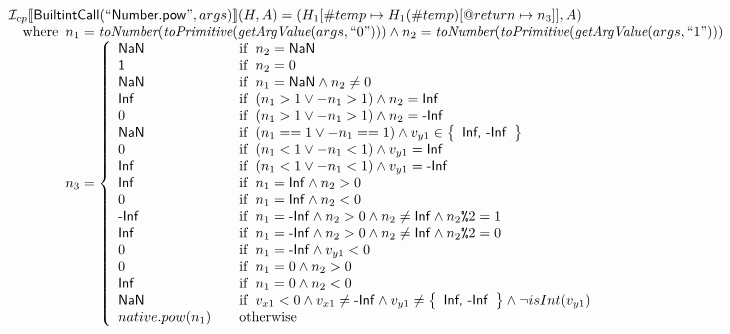\[
\begin{array}{l}

\I _{cp}\lbr \SF{BuiltintCall}(``\SF{Number.pow}",args)\rbr(H,A)
  = (H_1[\#temp \mapsto H_1(\#temp)[@return \mapsto n_3]], A)\\
\quad\wherec{
  n_1 = \hf{toNumber}(\hf{toPrimitive}(\hf{getArgValue}(args, ``0")))
  \land n_2 = \hf{toNumber}(\hf{toPrimitive}(\hf{getArgValue}(args, ``1")))\\
  n_3 = \left\{
    \begin{array}{l@{\quad\quad}l}
      \SF{NaN} & \ifc{n_2 =\SF{NaN}}\\
      \SF{1}   & \ifc{n_2 =0}\\
      \SF{NaN} & \ifc{n_1=\SF{NaN} \land n_2 \neq0}\\
      \SF{Inf} & \ifc{(n_1 > 1 \lor -n_1 > 1) \land n_2 =\SF{Inf}}\\
      0        & \ifc{(n_1 > 1 \lor -n_1 > 1) \land n_2 =\SF{-Inf}}\\
      \SF{NaN} & \ifc{(n_1 == 1 \lor -n_1 == 1) \land v_{y1}\in\set{\SF{Inf, -Inf}}}\\
      0        & \ifc{(n_1 < 1 \lor -n_1 < 1) \land v_{y1}=\SF{Inf}}\\
      \SF{Inf} & \ifc{(n_1 < 1 \lor -n_1 < 1) \land v_{y1}=\SF{-Inf}}\\
      \SF{Inf} & \ifc{n_1=\SF{Inf} \land n_2>0}\\
      0        & \ifc{n_1=\SF{Inf} \land n_2<0}\\
      \SF{-Inf} & \ifc{n_1=\SF{-Inf} \land n_2 > 0 \land n_2 \neq \SF{Inf} \land n_2 \TT{\%} 2 = 1}\\
      \SF{Inf} & \ifc{n_1=\SF{-Inf} \land n_2 > 0 \land n_2 \neq \SF{Inf}  \land  n_2 \TT{\%} 2 = 0}\\
      0        & \ifc{n_1=\SF{-Inf} \land v_{y1}<0}\\
      0        & \ifc{n_1 =0 \land n_2 >0}\\
      \SF{Inf} & \ifc{n_1 =0 \land n_2 <0}\\

      \SF{NaN} & \ifc{v_{x1}<0 \land v_{x1}\neq\SF{-Inf} \land v_{y1}\neq\set{\SF{Inf, -Inf}} \land \neg isInt(v_{y1})}\\
      native.pow(n_1) & \owc 
    \end{array}
  \right.
  }\\
\\\\




\end{array}\]
